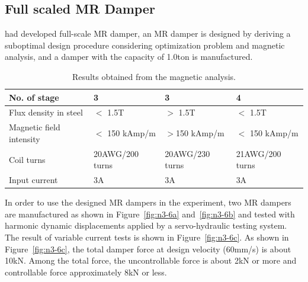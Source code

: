 \subsection{Full scaled MR Damper}
\citet{lee2010experimental} had developed full-scale MR damper, an MR damper is designed by deriving a suboptimal design procedure considering optimization problem and magnetic analysis, and a damper with the capacity of 1.0ton is manufactured.

\begin{table}[ht]
\centering
\begin{tabularx}{\textwidth}{@{}X|X|X|X@{}}
\toprule[1pt]\midrule[0.3pt]
No. of stage & 3 & 3 & 4\\ \hline
Flux density in steel & $<$ 1.5T & $>$ 1.5T & $<$ 1.5T\\
Magnetic field intensity & $<$ 150 kAmp/m  & $>$150 kAmp/m  & $<$ 150 kAmp/m \\
Coil turns & 20AWG/200 turns  & 20AWG/230 turns & 21AWG/200 turns  \\
Input current & 3A  & 3A & 3A  \\
\bottomrule
\end{tabularx}
\caption{Results obtained from the magnetic analysis.}
\label{tab:n3-1}
\end{table}

In order to use the designed MR dampers in the experiment, two MR dampers are manufactured as shown in Figure~\ref{fig:n3-6a} and~\ref{fig:n3-6b} and tested with harmonic dynamic displacements applied by a servo-hydraulic testing system. The result of variable current tests is shown in Figure~\ref{fig:n3-6c}. As shown in Figure~\ref{fig:n3-6c}, the total damper force at design velocity (60mm/s) is about 10kN. Among the total force, the uncontrollable force is about 2kN or more and controllable force approximately 8kN or less.

